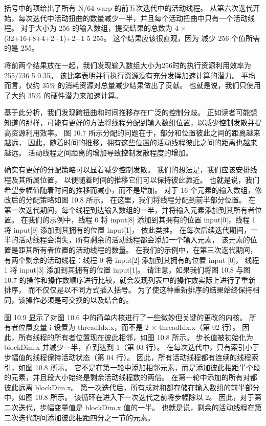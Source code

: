 括号中的项给出了所有 N/64 warp 的前五次迭代中的活动线程。 
从第六次迭代开始，每次迭代中活动扭曲的数量减少一半，并且每个活动扭曲中只有一个活动线程。 
对于大小为 256 的输入数组，提交结果的总数为 4 × (32+16+8+4+2+1)+2+1 5 255。
这个结果应该很直观，因为 减少 256 个值所需的是 255。

将前两个结果放在一起，我们发现输入数组大小为256时的执行资源利用效率为255/736 5 0.35。 该比率表明并行执行资源没有充分发挥加速计算的潜力。 平均而言，仅约 35\% 的消耗资源对总量减少结果做出了贡献。 也就是说，我们只使用了大约 35\% 的硬件潜力来加速计算。

基于此分析，我们发现跨扭曲和时间推移存在广泛的控制分歧。 
正如读者可能想知道的那样，可能有更好的方法将线程分配到输入数组位置，以减少控制发散并提高资源利用效率。 
图 10.7 所示分配的问题在于，部分和位置彼此之间的距离越来越远，
因此，随着时间的推移，拥有这些位置的活动线程彼此之间的距离也越来越远。 活动线程之间距离的增加导致控制发散程度的增加。

确实有更好的分配策略可以显着减少控制发散。 我们的想法是，我们应该安排线程及其所属位置，
以便随着时间的推移它们可以保持彼此靠近。 也就是说，我们希望步幅值随着时间的推移而减小，而不是增加。 
对于 16 个元素的输入数组，修改后的分配策略如图 10.8 所示。 在这里，我们将线程分配到前半部分位置。 
在第一次迭代期间，每个线程到达输入数组的一半，并将输入元素添加到其所有者位置。 
在我们的示例中，线程 0 将 input[8] 添加到其拥有的位置 input[0]，线程 1 将 input[9] 添加到其拥有的位置 input[1]，
依此类推。 在每次后续迭代期间，一半的活动线程会消失，所有剩余的活动线程都会添加一个输入元素，
该元素的位置是距其所有者位置的活动线程的数量。 
在我们的示例中，在第三次迭代期间，有两个剩余的活动线程：线程 0 将 input[2] 添加到其拥有的位置 input [0]，
线程 1 将 input[3] 添加到其拥有的位置 input[1]。 
请注意，如果我们将图 10.8 与图 10.7 的操作和操作数顺序进行比较，就会发现列表中的操作数实际上进行了重新排序，
而不仅仅是以不同方式插入括号。 为了使这种重新排序的结果始终保持相同，该操作必须是可交换的以及结合的。

图 10.9 显示了对图 10.6 中的简单内核进行了一些微妙但关键的更改的内核。 
所有者位置变量 i 设置为 threadIdx.x，而不是 2 × threadIdx.x（第 02 行）。 
因此，所有线程的所有者位置现在彼此相邻，如图 10.8 所示。 步长值被初始化为 blockDim.x 并减少一半，直到达到 1（第 03 行）。 
在每次迭代中，只有索引小于步幅值的线程保持活动状态（第 04 行）。 因此，所有活动线程都有连续的线程索引，如图 10.8 所示。 
它不是在第一轮中添加相邻元素，而是添加彼此相距半个段的元素，并且段大小始终是剩余活动线程数的两倍。 
在第一轮中添加的所有对都彼此远离 blockDim.x。 第一次迭代后，所有成对和都存储在输入数组的前半部分中，如图 10.8 所示。 
该循环在进入下一次迭代之前将步幅除以 2。 因此，对于第二次迭代，步幅变量值是 blockDim.x 值的一半。 
也就是说，剩余的活动线程在第二次迭代期间添加彼此相距四分之一节的元素。

